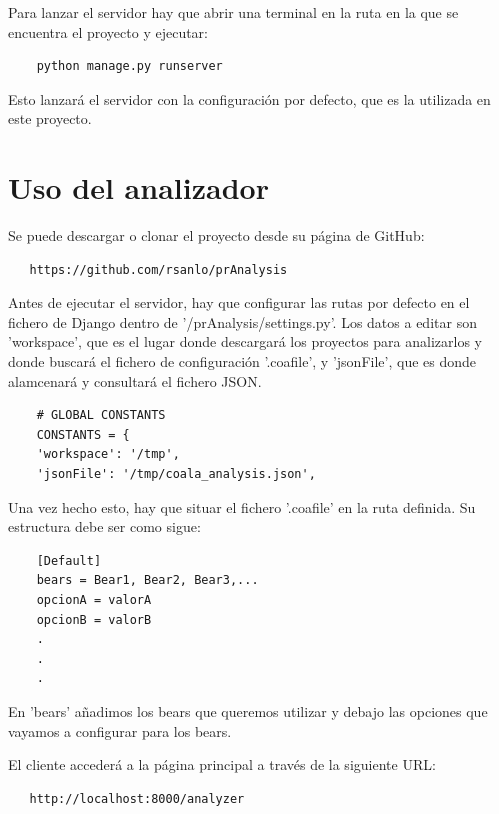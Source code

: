 \documentclass[a4paper, 12pt]{book}
\begin{document}
Para lanzar el servidor hay que abrir una terminal en la ruta en la que se encuentra el proyecto y ejecutar:
{\footnotesize
\begin{verbatim}
    python manage.py runserver
\end{verbatim}
}
Esto lanzará el servidor con la configuración por defecto, que es la utilizada en este proyecto.

\section{Uso del analizador}
\label{app:analyzer}
Se puede descargar o clonar el proyecto desde su página de GitHub:
{\footnotesize
\begin{verbatim}
   https://github.com/rsanlo/prAnalysis
\end{verbatim}
}

Antes de ejecutar el servidor, hay que configurar las rutas por defecto en el fichero de Django dentro de '/prAnalysis/settings.py'. Los datos a editar son 'workspace', que es el lugar donde descargará los proyectos para analizarlos y donde buscará el fichero de configuración '.coafile', y 'jsonFile', que es donde alamcenará y consultará el fichero JSON.
{\footnotesize
\begin{verbatim}
    # GLOBAL CONSTANTS
    CONSTANTS = {
    'workspace': '/tmp',
    'jsonFile': '/tmp/coala_analysis.json',
\end{verbatim}
}
Una vez hecho esto, hay que situar el fichero '.coafile' en la ruta definida. Su estructura debe ser como sigue:
{\footnotesize
\begin{verbatim}
    [Default]
    bears = Bear1, Bear2, Bear3,...
    opcionA = valorA
    opcionB = valorB
    .
    .
    .
\end{verbatim}
}

En 'bears' añadimos los bears que queremos utilizar y debajo las opciones que vayamos a configurar para los bears.

El cliente accederá a la página principal a través de la siguiente URL:
{\footnotesize
\begin{verbatim}
   http://localhost:8000/analyzer
\end{verbatim}
}



\cleardoublepage


\end{document}
